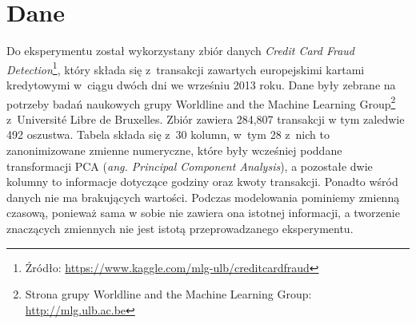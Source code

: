 \documentclass[inzynierska]{pwr_wmat_praca_dyplomowa}
\theoremstyle{plain}
\numberwithin{theorem}{chapter}
\theoremstyle{definition}
\numberwithin{theorem}{chapter}
\begin{document}
\section{Dane}
Do eksperymentu został wykorzystany zbiór danych \emph{Credit Card Fraud Detection}\footnote{Źródło: \url{https://www.kaggle.com/mlg-ulb/creditcardfraud}}, który składa się z~transakcji zawartych europejskimi kartami kredytowymi w~ciągu dwóch dni we wrześniu 2013 roku. Dane były zebrane na potrzeby badań naukowych grupy Worldline and the Machine Learning Group\footnote{Strona grupy Worldline and the Machine Learning Group: \url{http://mlg.ulb.ac.be}} z~Université Libre de Bruxelles. Zbiór zawiera 284,807 transakcji w tym zaledwie 492 oszustwa. Tabela składa się z~30 kolumn, w~tym 28 z~nich to zanonimizowane zmienne numeryczne, które były wcześniej poddane transformacji PCA (\textit{ang. Principal Component Analysis}), a pozostałe dwie kolumny to informacje dotyczące godziny oraz kwoty transakcji. Ponadto wśród danych nie ma brakujących wartości. Podczas modelowania pominiemy zmienną czasową, ponieważ sama w sobie nie zawiera ona istotnej informacji, a tworzenie znaczących zmiennych nie jest istotą przeprowadzanego eksperymentu. 
\end{document}
